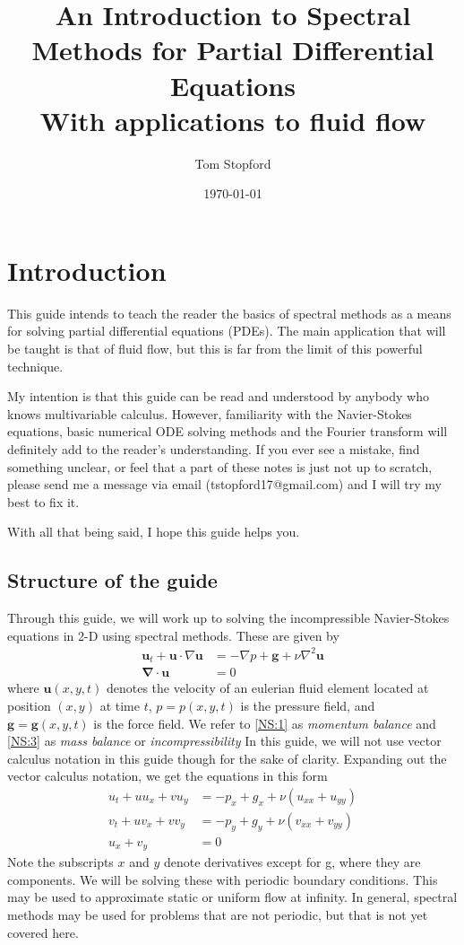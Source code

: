 \documentclass[a4paper,11pt]{article}
\title{An Introduction to Spectral Methods for Partial Differential Equations \\ \large With applications to fluid flow}
\author{Tom Stopford}
\date{\today}
\theoremstyle{plain} %
\theoremstyle{remark}
\theoremstyle{definition} %
\renewcommand{\u}{\mathbf{u}}
\newcommand{\g}{\mathbf{g}}
\renewcommand{\div}{\mathbf{\nabla} \cdot}
\begin{document}
  

\maketitle

\section{Introduction}
This guide intends to teach the reader the basics of spectral methods as a means for solving partial differential equations (PDEs). The main application that will be taught is that of fluid flow, but this is far from the limit of this powerful technique. 

My intention is that this guide can be read and understood by anybody who knows multivariable calculus. However, familiarity with the Navier-Stokes equations, basic numerical ODE solving methods and the Fourier transform will definitely add to the reader's understanding. If you ever see a mistake, find something unclear, or feel that a part of these notes is just not up to scratch, please send me a message via email (tstopford17@gmail.com) and I will try my best to fix it. 

With all that being said, I hope this guide helps you.

\subsection{Structure of the guide}
Through this guide, we will work up to solving the incompressible Navier-Stokes equations in 2-D using spectral methods. These are given by
\begin{align}
\label{NS:1}\u_t + \u\cdot \nabla \u &= -\nabla p + \g + \nu \nabla^2\u \\
\label{NS:3}\div\u &= 0
\end{align}
where $\u(x,y,t)$ denotes the velocity of an eulerian fluid element located at position $(x,y)$ at time $t$, $p=p(x,y,t)$ is the pressure field, and $\g=\g(x,y,t)$ is the force field. We refer to \ref{NS:1} as \emph{momentum balance} and \ref{NS:3} as \emph{mass balance} or \emph{incompressibility} In this guide, we will not use vector calculus notation in this guide though for the sake of clarity. Expanding out the vector calculus notation, we get the equations in this form
\begin{align*}
u_t+u u_x+v u_y &= -p_x + g_x + \nu \left(u_{xx}+u_{yy}\right)\\ 
v_t+u v_x+v v_y &= -p_y + g_y + \nu \left(v_{xx}+v_{yy}\right) \\ 
u_x+v_y&=0 
\end{align*}
Note the subscripts $x$ and $y$ denote derivatives except for g, where they are components. We will be solving these with periodic boundary conditions. This may be used to approximate static or uniform flow at infinity. In general, spectral methods may be used for problems that are not periodic, but that is not yet covered here.
\end{document}
